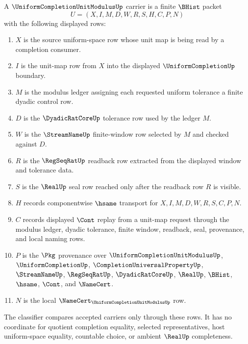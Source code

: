 \begin{definition}
\label{def:uniform-completion-unit-modulus-carrier}
A $\UniformCompletionUnitModulusUp$ carrier is a finite $\BHist$ packet
$$
U=(X,I,M,D,W,R,S,H,C,P,N)
$$
with the following displayed rows:
\begin{enumerate}
\item $X$ is the source uniform-space row whose unit map is being read by a
completion consumer.
\item $I$ is the unit-map row from $X$ into the displayed
$\UniformCompletionUp$ boundary.
\item $M$ is the modulus ledger assigning each requested uniform tolerance a
finite dyadic control row.
\item $D$ is the $\DyadicRatCoreUp$ tolerance row used by the ledger $M$.
\item $W$ is the $\StreamNameUp$ finite-window row selected by $M$ and checked
against $D$.
\item $R$ is the $\RegSeqRatUp$ readback row extracted from the displayed
window and tolerance data.
\item $S$ is the $\RealUp$ seal row reached only after the readback row $R$ is
visible.
\item $H$ records componentwise $\hsame$ transport for
$X,I,M,D,W,R,S,C,P,N$.
\item $C$ records displayed $\Cont$ replay from a unit-map request through the
modulus ledger, dyadic tolerance, finite window, readback, seal, provenance,
and local naming rows.
\item $P$ is the $\Pkg$ provenance over $\UniformCompletionUnitModulusUp$,
$\UniformCompletionUp$, $\CompletionUniversalPropertyUp$, $\StreamNameUp$,
$\RegSeqRatUp$, $\DyadicRatCoreUp$, $\RealUp$, $\BHist$, $\hsame$, $\Cont$,
and $\NameCert$.
\item $N$ is the local
$\NameCert_{\UniformCompletionUnitModulusUp}$ row.
\end{enumerate}
The classifier compares accepted carriers only through these rows. It has no
coordinate for quotient completion equality, selected representatives, host
uniform-space equality, countable choice, or ambient $\RealUp$ completeness.
\end{definition}

